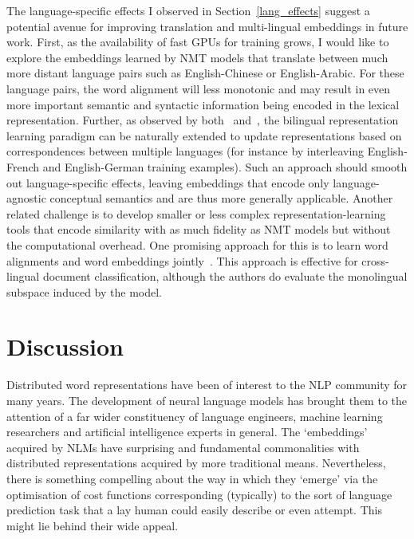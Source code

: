 The language-specific effects I observed in Section~\ref{lang_effects} suggest a potential avenue for improving translation and multi-lingual embeddings in future work. First, as the availability of fast GPUs for training grows, I would like to explore the embeddings learned by NMT models that translate between much more distant language pairs such as English-Chinese or English-Arabic. For these language pairs, the word alignment will less monotonic and may result in even more important semantic and syntactic information being encoded in the lexical representation. Further,  as observed by both~\cite{Hermann:2014:ICLR} and~\cite{faruqui2014improving}, the bilingual representation learning paradigm can be naturally extended to update representations based on correspondences between multiple languages (for instance by interleaving English-French and English-German training examples). Such an approach should smooth out language-specific effects, leaving embeddings that encode only language-agnostic conceptual semantics and are thus more generally applicable. Another related challenge is to develop smaller or less complex representation-learning tools that encode similarity with as much fidelity as NMT models but without the computational overhead. One promising approach for this is to learn word alignments and word embeddings jointly~\citep{Kocisky:2014}. This approach is effective for cross-lingual document classification, although the authors do evaluate the monolingual subspace induced by the model.

\section{Discussion}

Distributed word representations have been of interest to the NLP community for many years. The development of neural language models has brought them to the attention of a far wider constituency of language engineers, machine learning researchers and artificial intelligence experts in general. The `embeddings' acquired by NLMs have surprising and fundamental commonalities with distributed representations acquired by more traditional means. Nevertheless, there is something compelling about the way in which they `emerge' via the optimisation of cost functions corresponding (typically) to the sort of language prediction task that a lay human could easily describe or even attempt. This might lie behind their wide appeal.  

